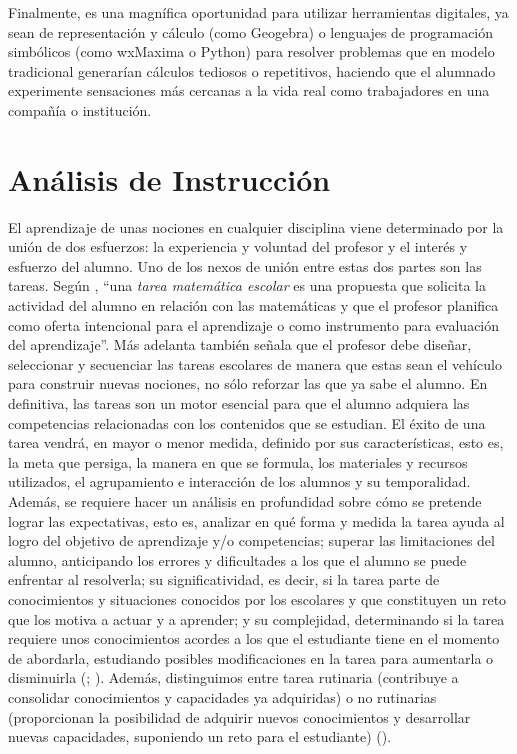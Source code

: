 \documentclass[../main.tex]{memoir}
\begin{document}
Finalmente, es una magnífica oportunidad para utilizar herramientas digitales, ya sean de representación y cálculo (como Geogebra) o lenguajes de programación simbólicos (como wxMaxima o Python) para resolver problemas que en modelo tradicional generarían cálculos tediosos o repetitivos, haciendo que el alumnado experimente sensaciones más cercanas a la vida real como trabajadores en una compañía o institución. 

\section{Análisis de Instrucción}

El aprendizaje de unas nociones en cualquier disciplina viene determinado  por la unión de dos esfuerzos: la experiencia y voluntad del profesor y el interés y esfuerzo del alumno. Uno de los nexos de unión entre estas dos partes son las tareas. Según \cite{rico2016}, ``una \textit{tarea matemática escolar} es una propuesta que solicita la actividad del alumno en relación con las matemáticas y que el profesor planifica como oferta intencional para el aprendizaje o como instrumento para evaluación del aprendizaje''. Más adelanta también señala que el profesor debe diseñar, seleccionar y secuenciar las tareas escolares de manera que estas sean el vehículo para construir nuevas nociones, no sólo reforzar las que ya sabe el alumno. En definitiva, las tareas son un motor esencial para que el alumno adquiera las competencias relacionadas con los contenidos que se estudian. El éxito de una tarea vendrá, en mayor o menor medida, definido por sus características, esto es, la meta que persiga, la manera en que se formula, los materiales y recursos utilizados, el agrupamiento e interacción de los alumnos y su temporalidad. Además, se requiere hacer un análisis en profundidad sobre cómo se pretende lograr las expectativas, esto es, analizar en qué forma y medida la tarea ayuda al logro del objetivo de aprendizaje y/o competencias; superar las limitaciones del alumno, anticipando los errores y dificultades a los que el alumno se puede enfrentar al resolverla; su significatividad, es decir, si la tarea parte de conocimientos y situaciones conocidos por los escolares y que constituyen un reto que los motiva a actuar y a aprender; y su complejidad, determinando si la tarea requiere unos conocimientos acordes a los que el estudiante tiene en el momento de abordarla, estudiando posibles modificaciones en la tarea para aumentarla o disminuirla (\cite{rico2016}; \cite{lupi2013}). Además, distinguimos entre tarea rutinaria (contribuye a consolidar conocimientos y capacidades ya adquiridas) o no rutinarias (proporcionan la posibilidad de adquirir nuevos conocimientos y desarrollar nuevas capacidades, suponiendo un reto para el estudiante) (\cite{rico2016}). \\
\end{document}
